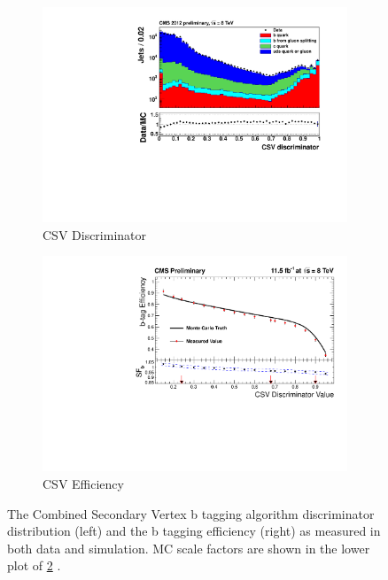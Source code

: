 \begin{figure}[h!]
  \centering
  \begin{subfigure}[b]{0.46\textwidth}
    \includegraphics[width=\textwidth]{Figs/btag/csv_discrim.pdf}
    \caption{CSV Discriminator}
    \label{fig:btag_csv_discrim}
  \end{subfigure}
  \begin{subfigure}[b]{0.46\textwidth}
    \includegraphics[width=\textwidth]{Figs/btag/csv_eff.pdf}
    \caption{CSV Efficiency}
    \label{fig:btag_csv_eff}
  \end{subfigure}
  \caption{The Combined Secondary Vertex b tagging algorithm discriminator
  distribution (left) and the b tagging efficiency (right) as measured in both
  data and simulation. MC scale factors are shown in the lower plot of
  \ref{fig:btag_csv_eff} \cite{CMS-PAS-BTV-13-001}.}
  \label{fig:btag_csv}
\end{figure}

